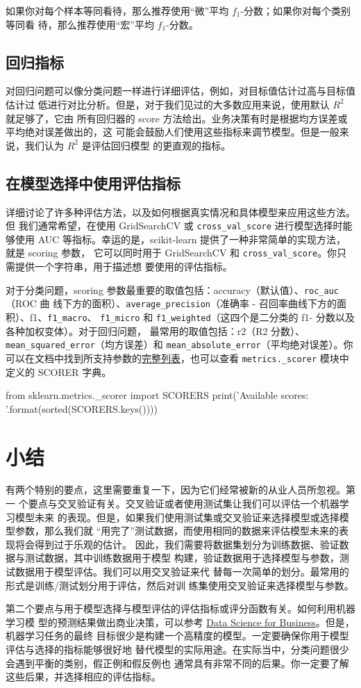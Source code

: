 如果你对每个样本等同看待，那么推荐使用“微”平均 $f_1$-分数；如果你对每个类别等同看
待，那么推荐使用“宏”平均 $f_1$-分数。
\subsection{回归指标}
对回归问题可以像分类问题一样进行详细评估，例如，对目标值估计过高与目标值估计过
低进行对比分析。但是，对于我们见过的大多数应用来说，使用默认 $R^2$ 就足够了，它由
所有回归器的 score 方法给出。业务决策有时是根据均方误差或平均绝对误差做出的，这
可能会鼓励人们使用这些指标来调节模型。但是一般来说，我们认为 $R^2$ 是评估回归模型
的更直观的指标。
\subsection{在模型选择中使用评估指标}
详细讨论了许多种评估方法，以及如何根据真实情况和具体模型来应用这些方法。但
我们通常希望，在使用 GridSearchCV 或 \verb|cross_val_score| 进行模型选择时能够使用 AUC
等指标。幸运的是，scikit-learn 提供了一种非常简单的实现方法，就是 scoring 参数，
它可以同时用于 GridSearchCV 和 \verb|cross_val_score|。你只需提供一个字符串，用于描述想
要使用的评估指标。

对于分类问题，scoring 参数最重要的取值包括：accuracy（默认值）、\verb|roc_auc|（ROC 曲
线下方的面积）、\verb|average_precision|（准确率 - 召回率曲线下方的面积）、f1、\verb|f1_macro|、
\verb|f1_micro| 和 \verb|f1_weighted|（这四个是二分类的 f1- 分数以及各种加权变体）。对于回归问题，
最常用的取值包括：r2（R2 分数）、\verb|mean_squared_error|（均方误差）和 \verb|mean_absolute_error|（平均绝对误差）。你可以在文档中找到所支持参数的\href{https://scikit-learn.org/stable/modules/model_evaluation.html#the-scoring-parameter-defining-model-evaluation-rules}{完整列表}，也可以查看 \verb|metrics._scorer| 模块中定义的 SCORER 字典。

\begin{pyc}
    from sklearn.metrics._scorer import SCORERS
    print('Available scores: \n{}'.format(sorted(SCORERS.keys())))
\end{pyc}
\section{小结}
有两个特别的要点，这里需要重复一下，因为它们经常被新的从业人员所忽视。第一
个要点与交叉验证有关。交叉验证或者使用测试集让我们可以评估一个机器学习模型未来
的表现。但是，如果我们使用测试集或交叉验证来选择模型或选择模型参数，那么我们就
“用完了”测试数据，而使用相同的数据来评估模型未来的表现将会得到过于乐观的估计。
因此，我们需要将数据集划分为训练数据、验证数据与测试数据，其中训练数据用于模型
构建，验证数据用于选择模型与参数，测试数据用于模型评估。我们可以用交叉验证来代
替每一次简单的划分。最常用的形式是训练/测试划分用于评估，然后对训
练集使用交叉验证来选择模型与参数。

第二个要点与用于模型选择与模型评估的评估指标或评分函数有关。如何利用机器学习模
型的预测结果做出商业决策，可以参考 \href{https://www.oreilly.com/library/view/data-science-for/9781449374273/}{Data Science for Business}。但是，机器学习任务的最终
目标很少是构建一个高精度的模型。一定要确保你用于模型评估与选择的指标能够很好地
替代模型的实际用途。在实际当中，分类问题很少会遇到平衡的类别，假正例和假反例也
通常具有非常不同的后果。你一定要了解这些后果，并选择相应的评估指标。